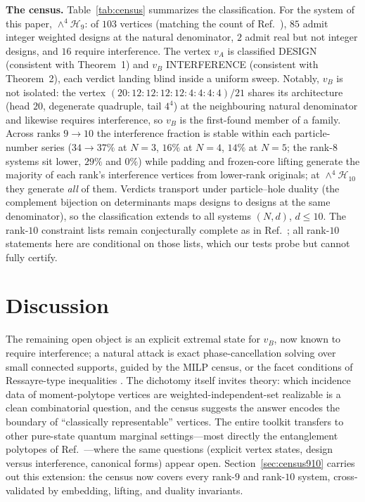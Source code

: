 \documentclass[11pt]{article}
\begin{document}
\textbf{The census.} Table~\ref{tab:census} summarizes the classification.
For the system of this paper, $\wedge^4\mathcal{H}_9$: of $103$ vertices
(matching the count of Ref.~\cite{AK2008}), $85$ admit integer weighted
designs at the natural denominator, $2$ admit real but not integer designs,
and $16$ require interference. The vertex $v_A$ is classified DESIGN
(consistent with Theorem~1) and $v_B$ INTERFERENCE (consistent with
Theorem~2), each verdict landing blind inside a uniform sweep. Notably,
$v_B$ is not isolated: the vertex
$(20{:}12{:}12{:}12{:}12{:}4{:}4{:}4{:}4)/21$ shares its architecture
(head $20$, degenerate quadruple, tail $4^4$) at the neighbouring natural
denominator and likewise requires interference, so $v_B$ is the first-found
member of a family. Across ranks $9\to 10$ the interference fraction is stable within each particle-number series ($34\to 37\%$ at $N{=}3$, $16\%$ at $N{=}4$, $14\%$ at $N{=}5$; the rank-$8$ systems sit lower, $29\%$ and $0\%$) while padding and frozen-core
lifting generate the majority of each rank's interference vertices from
lower-rank originals; at $\wedge^4\mathcal{H}_{10}$ they generate
\emph{all} of them. Verdicts transport under particle--hole duality (the
complement bijection on determinants maps designs to designs at the same
denominator), so the classification extends to all systems
$(N,d)$, $d \le 10$. The rank-$10$ constraint lists remain conjecturally
complete as in Ref.~\cite{AK2008}; all rank-$10$ statements here are
conditional on those lists, which our tests probe but cannot fully certify.


\section{Discussion}

The remaining open object is an explicit extremal state for $v_B$, now known
to require interference; a natural attack is exact phase-cancellation
solving over small connected supports, guided by the MILP census, or the
facet conditions of Ressayre-type inequalities \cite{Ressayre}. The
dichotomy itself invites theory: which incidence data of moment-polytope
vertices are weighted-independent-set realizable is a clean combinatorial
question, and the census suggests the answer encodes the boundary of
``classically representable'' vertices. The entire toolkit transfers to
other pure-state quantum marginal settings---most directly the entanglement
polytopes of Ref.~\cite{WDGC2013}---where the same questions (explicit
vertex states, design versus interference, canonical forms) appear open.
Section~\ref{sec:census910} carries out this extension: the census now covers every rank-$9$ and rank-$10$ system, cross-validated by embedding, lifting, and duality invariants.
\end{document}

